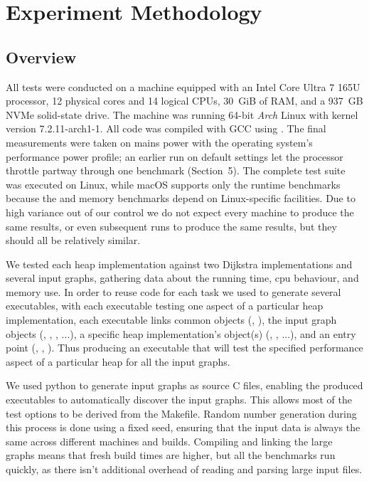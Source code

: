 \section{Experiment Methodology}

\subsection{Overview}

All tests were conducted on a machine equipped with an Intel Core Ultra 7
165U processor, 12 physical cores and 14 logical CPUs, 30~GiB of RAM, and a
937~GB NVMe solid-state drive. The machine was running 64-bit \emph{Arch} Linux with
kernel version 7.2.11-arch1-1. All code was compiled with GCC using
. The final measurements were taken on mains power with the
operating system's performance power profile; an earlier run on default
settings let the processor throttle partway through one benchmark (Section~5).
The complete test suite was executed on Linux, while macOS supports only the runtime benchmarks because the  and memory benchmarks depend on Linux-specific facilities. Due to high
variance out of our control we do not expect every machine to produce the same
results, or even subsequent runs to produce the same results, but they should
all be relatively similar.

We tested each heap implementation against two Dijkstra implementations and
several input graphs, gathering data about the running time, cpu behaviour, and
memory use.
In order to reuse code for each task we used  to generate several
executables, with each executable testing one aspect of a particular heap
implementation, each executable links common objects (, ), the
input graph objects (, , ,
...), a specific heap implementation's object(s) (, , ...),
and an entry point (, , ). Thus producing an
executable that will test the specified performance aspect of a particular heap
for all the input graphs.

We used python to generate input graphs as source C files, enabling the produced
executables to automatically discover the input graphs. This allows most of the
test options to be derived from the Makefile. Random number generation during
this process is done using a fixed seed, ensuring that the input data is always
the same across different machines and builds. Compiling and linking the large
graphs means that fresh build times are higher, but all the benchmarks run
quickly, as there isn't additional overhead of reading and parsing large input
files.

